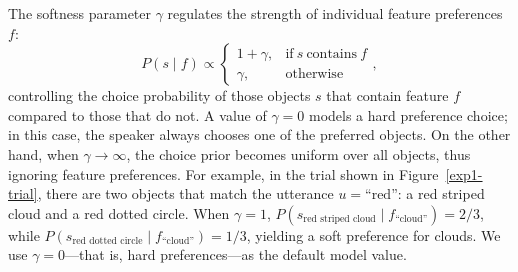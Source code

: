 \documentclass[11pt,a4paper]{article}
\begin{document}
The softness parameter $\gamma$ regulates the strength of individual feature preferences $f$:
\begin{equation}
	P(s \mid f) \propto \begin{cases}
		1 + \gamma, & \text{if}\ s\ \text{contains}\ f \\
		\gamma, & \text{otherwise}
	\end{cases},
\end{equation}
controlling the choice probability of those objects $s$ that contain feature $f$ compared to those that do not.  
A value of $\gamma=0$ models a hard preference choice; in this case, the speaker always chooses one of the preferred objects. 
On the other hand, when $\gamma \rightarrow \infty$, the choice prior becomes uniform over all objects, thus ignoring feature preferences. 
For example, in the trial shown in Figure~\ref{exp1-trial}, there are two objects that match the utterance $u=\text{``red''}$: a red striped cloud and a red dotted circle.
When $\gamma=1$, $P(s_{\textrm{red\ striped\ cloud}}\mid f_{\textrm{``cloud''}}) = 2/3$, while
$P(s_{\textrm{red\ dotted\ circle}}\mid f_{\textrm{``cloud''}})= 1/3$, yielding a soft preference for clouds.
We use $\gamma=0$---that is, hard preferences---as the default model value.
\end{document}
